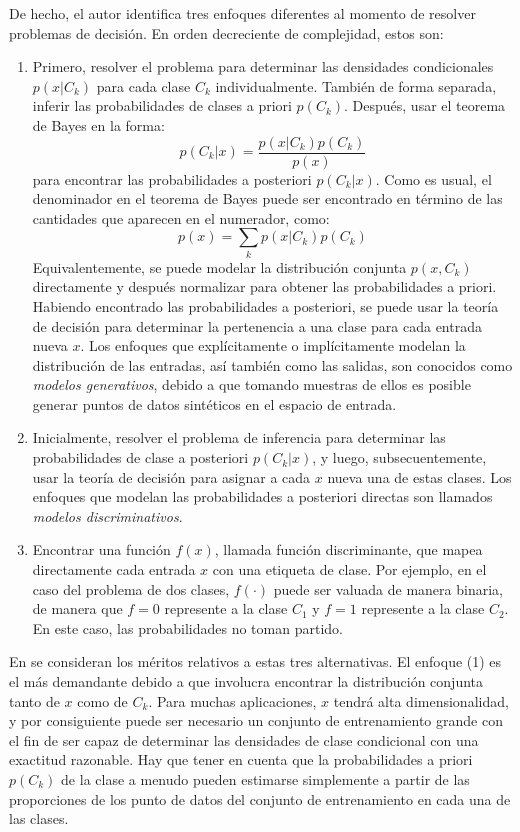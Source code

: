 	De hecho, el autor identifica tres enfoques diferentes al momento de resolver problemas de decisión. En orden decreciente de complejidad, estos son:
		\begin{enumerate}
			\item Primero, resolver el problema para determinar las densidades condicionales $p(x \vert C_k)$ para cada clase $C_k$ individualmente. También de forma separada, inferir las probabilidades de clases a priori $p(C_k)$. Des\-pués, usar el teorema de Bayes en la forma:
			$$p(C_k \vert x) = \frac{p(x \vert C_k)p(C_k)}{p(x)} $$
			para encontrar las probabilidades a posteriori $p(C_k \vert x)$. Como es usual, el denominador en el teorema de Bayes puede ser encontrado en término de las cantidades que aparecen en el numerador, como:
			 $$p(x) = \sum_k p(x \vert C_k)p(C_k) $$
			Equivalentemente, se puede modelar la distribución conjunta $p(x,C_k)$ directamente y después normalizar para obtener las probabilidades a priori. Habiendo encontrado las probabilidades a posteriori, se puede usar la teoría de decisión para determinar la pertenencia a una clase para cada entrada nueva $x$. Los enfoques que explícitamente o implícitamente modelan la distribución de las entradas, así también como las salidas, son conocidos como \textit{modelos generativos}, debido a que tomando muestras de ellos es posible generar puntos de datos sintéticos en el espacio de entrada.
			\item Inicialmente, resolver el problema de inferencia para determinar las  probabilidades de clase a posteriori $p(C_k \vert x)$, y luego, subsecuentemente, usar la teoría de decisión para asignar a cada $x$ nueva una de estas clases. Los enfoques que modelan las probabilidades a posteriori directas son llamados \textit{modelos discriminativos}.
			\item Encontrar una función $f(x)$, llamada función discriminante, que mapea directamente cada entrada $x$ con una etiqueta de clase. Por ejemplo, en el caso del problema de dos clases, $f(\cdot)$ puede ser valuada de ma\-ne\-ra binaria, de manera que $f = 0$ represente a la clase $C_1$ y $f = 1$ represente a la clase $C_2$. En este caso, las probabilidades no toman partido. 
		\end{enumerate}
		
	En \cite{Bis07} se consideran los méritos relativos a estas tres alternativas. El enfoque (1) es el más demandante debido a que involucra encontrar la distribución conjunta tanto de $x$ como de $C_k$. Para muchas aplicaciones, $x$ tendrá alta dimensionalidad, y por consiguiente puede ser necesario un conjunto de entrenamiento grande con el fin de ser capaz de determinar las densidades de clase condicional con una exactitud razonable. Hay que tener en cuenta que la probabilidades a priori $p(C_k)$ de la clase a menudo pueden estimarse simplemente a partir de las proporciones de los punto de datos del conjunto de entrenamiento en cada una de las clases.
		
